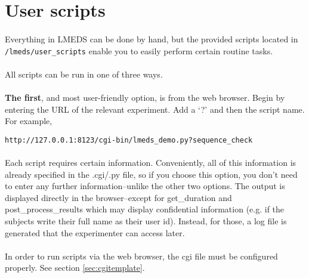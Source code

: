 
\section{User scripts}
\label{sec:users_scripts}

\paragraph{}
Everything in LMEDS can be done by hand, but the provided scripts located in \\\texttt{/lmeds/user\_scripts} enable you to easily perform certain routine tasks.

\paragraph{}
All scripts can be run in one of three ways.  

\paragraph{}
\textbf{The first}, and most user-friendly option, is from the web browser.  Begin by entering the URL of the relevant experiment.  Add a `?' and then the script name.  For example,
\begin{lstlisting}
http://127.0.0.1:8123/cgi-bin/lmeds_demo.py?sequence_check
\end{lstlisting}

\paragraph{}
Each script requires certain information.  Conveniently, all of this information is already specified in the .cgi/.py file, so if you choose this option, you don't need to enter any further information--unlike the other two options.  The output is displayed directly in the browser--except for get\_duration and post\_process\_results which may display confidential information (e.g. if the subjects write their full name as their user id).  Instead, for those, a log file is generated that the experimenter can access later.

\paragraph{}
In order to run scripts via the web browser, the cgi file must be configured properly.  See section \ref{sec:cgitemplate}.

